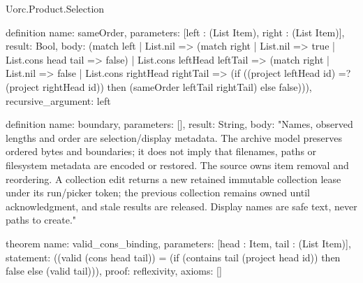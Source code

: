 \begin{lexlean}{Uorc.Product.Selection}
\begin{semanticmodule}
definition{
  name: sameOrder,
  parameters: [left : (List Item), right : (List Item)],
  result: Bool,
  body: (match left
    | List.nil => (match right | List.nil => true | List.cons head tail => false)
    | List.cons leftHead leftTail => (match right
      | List.nil => false
      | List.cons rightHead rightTail => (if ((project leftHead id) =? (project rightHead id)) then (sameOrder leftTail rightTail) else false))),
  recursive_argument: left
}

definition{
  name: boundary,
  parameters: [],
  result: String,
  body: "Names, observed lengths and order are selection/display metadata. The archive model preserves ordered bytes and boundaries; it does not imply that filenames, paths or filesystem metadata are encoded or restored. The source owns item removal and reordering. A collection edit returns a new retained immutable collection lease under its run/picker token; the previous collection remains owned until acknowledgment, and stale results are released. Display names are safe text, never paths to create."
}

theorem{
  name: valid_cons_binding,
  parameters: [head : Item, tail : (List Item)],
  statement: ((valid (cons head tail)) = (if (contains tail (project head id)) then false else (valid tail))),
  proof: reflexivity{},
  axioms: []
}
\end{semanticmodule}
\end{lexlean}
